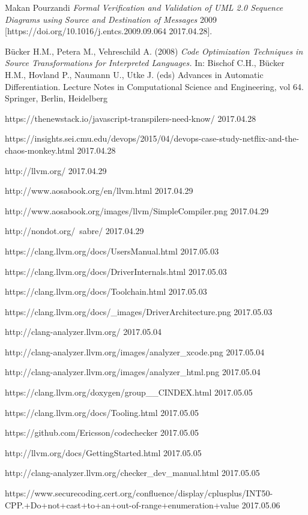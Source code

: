 \documentclass[a4paper,12pt]{report}
\begin{document}
\begin{thebibliography}{1}

 Makan Pourzandi {\em Formal Verification and Validation of UML
2.0 Sequence Diagrams using Source and
Destination of Messages}  2009 [https://doi.org/10.1016/j.entcs.2009.09.064 2017.04.28].

 Bücker H.M., Petera M., Vehreschild A. (2008) {\em Code Optimization Techniques in Source Transformations for Interpreted Languages.} In: Bischof C.H., Bücker H.M., Hovland P., Naumann U., Utke J. (eds) Advances in Automatic Differentiation. Lecture Notes in Computational Science and Engineering, vol 64. Springer, Berlin, Heidelberg

 https://thenewstack.io/javascript-transpilers-need-know/ 2017.04.28

 https://insights.sei.cmu.edu/devops/2015/04/devops-case-study-netflix-and-the-chaos-monkey.html 2017.04.28

 http://llvm.org/ 2017.04.29

 http://www.aosabook.org/en/llvm.html 2017.04.29

 http://www.aosabook.org/images/llvm/SimpleCompiler.png 2017.04.29

 http://nondot.org/~sabre/ 2017.04.29

 https://clang.llvm.org/docs/UsersManual.html 2017.05.03

 https://clang.llvm.org/docs/DriverInternals.html 2017.05.03

 https://clang.llvm.org/docs/Toolchain.html 2017.05.03

 https://clang.llvm.org/docs/\_images/DriverArchitecture.png 2017.05.03

 http://clang-analyzer.llvm.org/ 2017.05.04

 http://clang-analyzer.llvm.org/images/analyzer\_xcode.png 2017.05.04

 http://clang-analyzer.llvm.org/images/analyzer\_html.png 2017.05.04

 https://clang.llvm.org/doxygen/group\_\_CINDEX.html 2017.05.05

 https://clang.llvm.org/docs/Tooling.html 2017.05.05

 https://github.com/Ericsson/codechecker 2017.05.05

 http://llvm.org/docs/GettingStarted.html 2017.05.05

 http://clang-analyzer.llvm.org/checker\_dev\_manual.html 2017.05.05

 https://www.securecoding.cert.org/confluence/display/cplusplus/INT50-CPP.+Do+not+cast+to+an+out-of-range+enumeration+value 2017.05.06

\end{thebibliography}
\end{document}
